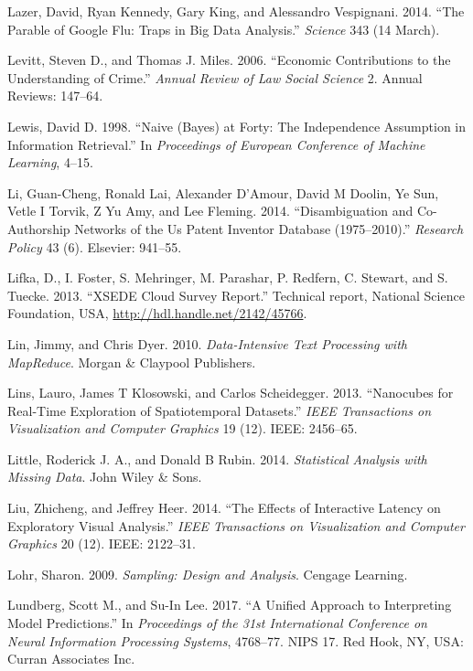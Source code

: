 \documentclass[]{krantz}
\begin{document}
\hypertarget{ref-lazer2014parable}{}
Lazer, David, Ryan Kennedy, Gary King, and Alessandro Vespignani. 2014.
``The Parable of Google Flu: Traps in Big Data Analysis.''
\emph{Science} 343 (14 March).

\hypertarget{ref-levitt2006economic}{}
Levitt, Steven D., and Thomas J. Miles. 2006. ``Economic Contributions
to the Understanding of Crime.'' \emph{Annual Review of Law Social
Science} 2. Annual Reviews: 147--64.

\hypertarget{ref-lewis-05}{}
Lewis, David D. 1998. ``Naive (Bayes) at Forty: The Independence
Assumption in Information Retrieval.'' In \emph{Proceedings of European
Conference of Machine Learning}, 4--15.

\hypertarget{ref-li2014disambiguation}{}
Li, Guan-Cheng, Ronald Lai, Alexander D'Amour, David M Doolin, Ye Sun,
Vetle I Torvik, Z Yu Amy, and Lee Fleming. 2014. ``Disambiguation and
Co-Authorship Networks of the Us Patent Inventor Database
(1975--2010).'' \emph{Research Policy} 43 (6). Elsevier: 941--55.

\hypertarget{ref-Lifka}{}
Lifka, D., I. Foster, S. Mehringer, M. Parashar, P. Redfern, C. Stewart,
and S. Tuecke. 2013. ``XSEDE Cloud Survey Report.'' Technical report,
National Science Foundation, USA,
\url{http://hdl.handle.net/2142/45766}.

\hypertarget{ref-lin2010data}{}
Lin, Jimmy, and Chris Dyer. 2010. \emph{Data-Intensive Text Processing
with MapReduce}. Morgan \& Claypool Publishers.

\hypertarget{ref-lins2013nanocubes}{}
Lins, Lauro, James T Klosowski, and Carlos Scheidegger. 2013.
``Nanocubes for Real-Time Exploration of Spatiotemporal Datasets.''
\emph{IEEE Transactions on Visualization and Computer Graphics} 19 (12).
IEEE: 2456--65.

\hypertarget{ref-little2014statistical}{}
Little, Roderick J. A., and Donald B Rubin. 2014. \emph{Statistical
Analysis with Missing Data}. John Wiley \& Sons.

\hypertarget{ref-liu2014effects}{}
Liu, Zhicheng, and Jeffrey Heer. 2014. ``The Effects of Interactive
Latency on Exploratory Visual Analysis.'' \emph{IEEE Transactions on
Visualization and Computer Graphics} 20 (12). IEEE: 2122--31.

\hypertarget{ref-lohr2009sampling}{}
Lohr, Sharon. 2009. \emph{Sampling: Design and Analysis}. Cengage
Learning.

\hypertarget{ref-Lundberg2017}{}
Lundberg, Scott M., and Su-In Lee. 2017. ``A Unified Approach to
Interpreting Model Predictions.'' In \emph{Proceedings of the 31st
International Conference on Neural Information Processing Systems},
4768--77. NIPS 17. Red Hook, NY, USA: Curran Associates Inc.
\end{document}
